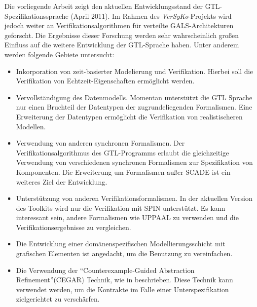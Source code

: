Die vorliegende Arbeit zeigt den aktuellen Entwicklungsstand der GTL-Spezifikationssprache (April 2011).
Im Rahmen des \emph{VerSyKo}-Projekts wird jedoch weiter an Verifikationsalgorithmen für verteilte GALS-Architekturen geforscht.
Die Ergebnisse dieser Forschung werden sehr wahrscheinlich großen Einfluss auf die weitere Entwicklung der GTL-Sprache haben.
Unter anderem werden folgende Gebiete untersucht:
\begin{itemize}
\item Inkorporation von zeit-basierter Modelierung und Verifikation.
  Hierbei soll die Verifikation von Echtzeit-Eigenschaften ermöglicht werden.
\item Vervollständigung des Datenmodells.
  Momentan unterstützt die GTL Sprache nur einen Bruchteil der Datentypen der zugrundeliegenden Formalismen.
  Eine Erweiterung der Datentypen ermöglicht die Verifikation von realistischeren Modellen.
\item Verwendung von anderen synchronen Formalismen.
  Der Verifikationsalgorithmus des GTL-Programms erlaubt die gleichzeitige Verwendung von verschiedenen synchronen Formalismen zur Spezifikation von Komponenten.
  Die Erweiterung um Formalismen außer SCADE ist ein weiteres Ziel der Entwicklung.
\item Unterstützung von anderen Verifikationsformalismen.
  In der aktuellen Version des Toolkits wird nur die Verifikation mit SPIN unterstützt.
  Es kann interessant sein, andere Formalismen wie UPPAAL zu verwenden und die Verifikationsergebnisse zu vergleichen.
\item Die Entwicklung einer domänenspezifischen Modellierungsschicht mit grafischen Elementen ist angedacht, um die Benutzung zu vereinfachen.
\item Die Verwendung der "`Counterexample-Guided Abstraction Refinement"'(CEGAR) Technik, wie in \cite{cegar} beschrieben.
  Diese Technik kann verwendet werden, um die Kontrakte im Falle einer Unterspezifikation zielgerichtet zu verschärfen.
\end{itemize}
